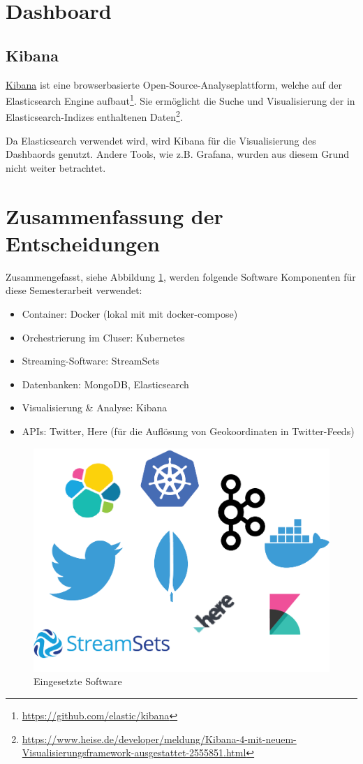 \section{Dashboard}
\label{sec:dashboard}
\subsection{Kibana}
\href{https://www.elastic.co/products/elastic-stack}{Kibana} ist eine browserbasierte Open-Source-Analyseplattform, welche auf der Elasticsearch Engine aufbaut\footnote{\label{foot:5} \url{https://github.com/elastic/kibana}}. Sie erm{\"o}glicht die Suche und Visualisierung der in Elasticsearch-Indizes enthaltenen Daten\footnote{\label{foot:6} \url{https://www.heise.de/developer/meldung/Kibana-4-mit-neuem-Visualisierungsframework-ausgestattet-2555851.html}}. 

Da Elasticsearch verwendet wird, wird Kibana f{\"u}r die Visualisierung des Dashbaords genutzt. Andere Tools, wie z.B. Grafana, wurden aus diesem Grund nicht weiter betrachtet.

\section{Zusammenfassung der Entscheidungen}
\label{sec:zusammenfassung}

Zusammengefasst, siehe Abbildung \ref{fig:used_sw}, werden folgende Software Komponenten f{\"u}r diese Semesterarbeit verwendet:
\begin{itemize}
  \item Container: Docker (lokal mit mit docker-compose)
  \item Orchestrierung im Cluser: Kubernetes
  \item Streaming-Software: StreamSets
  \item Datenbanken: MongoDB, Elasticsearch
  \item Visualisierung \& Analyse: Kibana
  \item APIs: Twitter, Here (f{\"u}r die Aufl{\"o}sung von Geokoordinaten in Twitter-Feeds)
\end{itemize}

\begin{figure}[H]
	\centering
		\includegraphics[scale=0.8 ]{images/used_sw.png}
	\caption{Eingesetzte Software}
	\label{fig:used_sw}
\end{figure}




